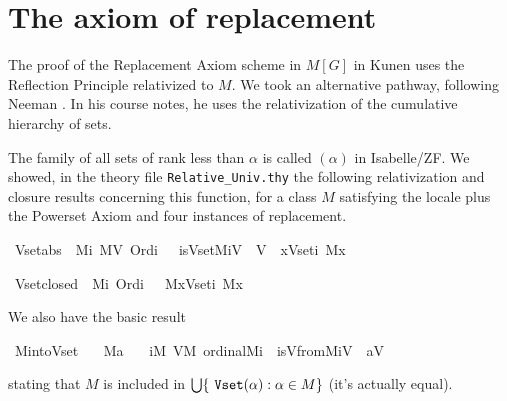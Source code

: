 \section{The axiom of replacement}

The proof of the Replacement Axiom scheme in $M[G]$ in Kunen uses the
Reflection Principle relativized to $M$. We took an alternative
pathway, following Neeman \cite{neeman-course}. In his course notes,
he uses the relativization of the cumulative hierarchy of sets. 

The
family of all sets of rank less than $\alpha$ is called
$(\alpha)$ in Isabelle/ZF. We showed, in the theory file
\texttt{Relative\_Univ.thy}
 the following
relativization and closure results concerning this function, for a
class $M$ satisfying the locale 
plus the Powerset Axiom and four instances of replacement.
%
\begin{isabelle}
\isamarkupfalse%
\ Vset{\isacharunderscore}abs{\isacharcolon}\ {\isachardoublequoteopen}{\isasymlbrakk}\ M{\isacharparenleft}i{\isacharparenright}{\isacharsemicolon}\ M{\isacharparenleft}V{\isacharparenright}{\isacharsemicolon}\ Ord{\isacharparenleft}i{\isacharparenright}\ {\isasymrbrakk}\ {\isasymLongrightarrow}\ is{\isacharunderscore}Vset{\isacharparenleft}M{\isacharcomma}i{\isacharcomma}V{\isacharparenright}\ {\isasymlongleftrightarrow}\ V\ {\isacharequal}\ {\isacharbraceleft}x{\isasymin}Vset{\isacharparenleft}i{\isacharparenright}{\isachardot}\ M{\isacharparenleft}x{\isacharparenright}{\isacharbraceright}{\isachardoublequoteclose}
\end{isabelle}
\begin{isabelle}
\isamarkupfalse%
\ Vset{\isacharunderscore}closed{\isacharcolon}\ {\isachardoublequoteopen}{\isasymlbrakk}\ M{\isacharparenleft}i{\isacharparenright}{\isacharsemicolon}\ Ord{\isacharparenleft}i{\isacharparenright}\ {\isasymrbrakk}\ {\isasymLongrightarrow}\ M{\isacharparenleft}{\isacharbraceleft}x{\isasymin}Vset{\isacharparenleft}i{\isacharparenright}{\isachardot}\ M{\isacharparenleft}x{\isacharparenright}{\isacharbraceright}{\isacharparenright}{\isachardoublequoteclose}
\end{isabelle}
We also have the basic result
\begin{isabelle}
\isamarkupfalse%
\ M{\isacharunderscore}into{\isacharunderscore}Vset{\isacharcolon}\isanewline
\ \ \ {\isachardoublequoteopen}M{\isacharparenleft}a{\isacharparenright}{\isachardoublequoteclose}\isanewline
\ \ \ {\isachardoublequoteopen}{\isasymexists}i{\isacharbrackleft}M{\isacharbrackright}{\isachardot}\ {\isasymexists}V{\isacharbrackleft}M{\isacharbrackright}{\isachardot}\ ordinal{\isacharparenleft}M{\isacharcomma}i{\isacharparenright}\ {\isasymand}\ is{\isacharunderscore}Vfrom{\isacharparenleft}M{\isacharcomma}{}{\isacharcomma}i{\isacharcomma}V{\isacharparenright}\ {\isasymand}\ a{\isasymin}V{\isachardoublequoteclose}
\end{isabelle}
stating that $M$ is included in 
$\union\{\isatt{Vset}(\alpha) : \alpha\in M\}$ (it's actually equal).

